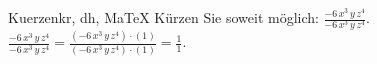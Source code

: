 \begin{MAufgabe}{Kuerzen}{kr, dh, MaTeX}
K\"urzen Sie soweit m\"oglich: $\frac{- 6\, x^3\, y\, z^4}{- 6\, x^3\, y\, z^4}$.\\ 
\ifLsg\MLoesung
\quad $\frac{- 6\, x^3\, y\, z^4}{- 6\, x^3\, y\, z^4}=\frac{(- 6\, x^3\, y\, z^4)\cdot(1)}{(- 6\, x^3\, y\, z^4)\cdot(1)}=\frac{1}{1}$.\else\relax\fi
 \end{MAufgabe}